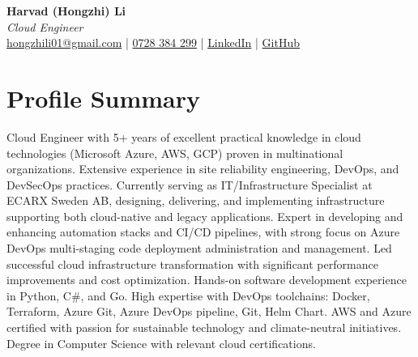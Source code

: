 \documentclass[11pt,a4paper]{article}
\begin{document}
\pagestyle{empty} %

\begin{center}
{\LARGE \textbf{Harvad (Hongzhi) Li}}\\[10pt]
{\Large \textit{Cloud Engineer}}\\[10pt]
\textcolor{linkedinblue}{\href{mailto:hongzhili01@gmail.com}{hongzhili01@gmail.com} | \href{tel:0728384299}{0728 384 299} | \href{https://www.linkedin.com/in/harvad/}{LinkedIn} | \href{https://github.com/bluehawana}{GitHub}}
\end{center}

\section*{Profile Summary}
Cloud Engineer with 5+ years of excellent practical knowledge in cloud technologies (Microsoft Azure, AWS, GCP) proven in multinational organizations. Extensive experience in site reliability engineering, DevOps, and DevSecOps practices. Currently serving as IT/Infrastructure Specialist at ECARX Sweden AB, designing, delivering, and implementing infrastructure supporting both cloud-native and legacy applications. Expert in developing and enhancing automation stacks and CI/CD pipelines, with strong focus on Azure DevOps multi-staging code deployment administration and management. Led successful cloud infrastructure transformation with significant performance improvements and cost optimization. Hands-on software development experience in Python, C\#, and Go. High expertise with DevOps toolchains: Docker, Terraform, Azure Git, Azure DevOps pipeline, Git, Helm Chart. AWS and Azure certified with passion for sustainable technology and climate-neutral initiatives. Degree in Computer Science with relevant cloud certifications.

\end{document}
